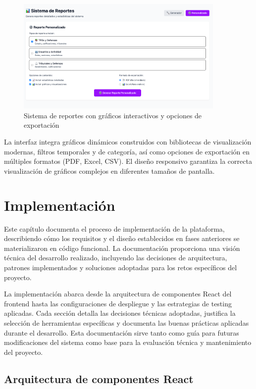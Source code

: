 \documentclass[12pt,a4paper,oneside]{report}
\begin{document}
\begin{figure}[H]
\centering
\includegraphics[width=0.9\textwidth]{processed/images/sistema_reportes.png}
\caption{Sistema de reportes con gráficos interactivos y opciones de exportación}
\label{fig:sistema-reportes}
\end{figure}

La interfaz integra gráficos dinámicos construidos con bibliotecas de visualización modernas, filtros temporales y de categoría, así como opciones de exportación en múltiples formatos (PDF, Excel, CSV). El diseño responsivo garantiza la correcta visualización de gráficos complejos en diferentes tamaños de pantalla.

\chapter{Implementación}\label{implementaciuxf3n}
Este capítulo documenta el proceso de implementación de la plataforma, describiendo cómo los requisitos y el diseño establecidos en fases anteriores se materializaron en código funcional. La documentación proporciona una visión técnica del desarrollo realizado, incluyendo las decisiones de arquitectura, patrones implementados y soluciones adoptadas para los retos específicos del proyecto.

La implementación abarca desde la arquitectura de componentes React del frontend hasta las configuraciones de despliegue y las estrategias de testing aplicadas. Cada sección detalla las decisiones técnicas adoptadas, justifica la selección de herramientas específicas y documenta las buenas prácticas aplicadas durante el desarrollo. Esta documentación sirve tanto como guía para futuras modificaciones del sistema como base para la evaluación técnica y mantenimiento del proyecto.

\section{Arquitectura de componentes
React}\label{arquitectura-de-componentes-react-1}
\end{document}

